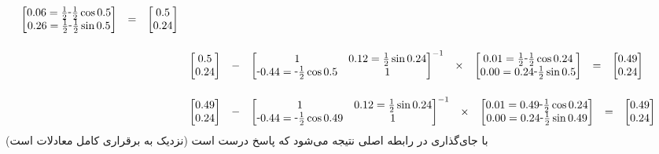 {\begin{align*}
\begin{array}{ccccccc}
\begin{bmatrix}
    0.06 = \frac{1}{2} \- \frac{1}{2} \cos{0.5} \\
    0.26 = \frac{1}{2} \- \frac{1}{2} \sin{0.5}
\end{bmatrix} &= &
\begin{bmatrix}
    0.5 \\
    0.24 
\end{bmatrix}
\end{array} \\
&\begin{array}{ccccccc}
 & & & & & \\
\begin{bmatrix}
    0.5 \\
    0.24
\end{bmatrix} & - & 
\begin{bmatrix}
    1 & 0.12 = \frac{1}{2} \sin{0.24} \\
    \-0.44 = \-\frac{1}{2} \cos{0.5} & 1
\end{bmatrix}^{-1} & \times &
\begin{bmatrix}
    0.01 = \frac{1}{2} \- \frac{1}{2} \cos{0.24} \\
    0.00 = 0.24 \- \frac{1}{2} \sin{0.5}
\end{bmatrix} &= &
\begin{bmatrix}
    0.49 \\
    0.24 
\end{bmatrix}
\end{array}
\\
&\begin{array}{ccccccc}
 & & & & & \\
\begin{bmatrix}
    0.49 \\
    0.24
\end{bmatrix} & - & 
\begin{bmatrix}
    1 & 0.12 = \frac{1}{2} \sin{0.24} \\
    \-0.44 = \-\frac{1}{2} \cos{0.49} & 1
\end{bmatrix}^{-1} & \times &
\begin{bmatrix}
    0.01 = 0.49 \- \frac{1}{2} \cos{0.24} \\
    0.00 = 0.24 \- \frac{1}{2} \sin{0.49}
\end{bmatrix} &= &
\begin{bmatrix}
    0.49 \\
    0.24 
\end{bmatrix}
\end{array}
\end{align*}
با جای‌گذاری در رابطه اصلی نتیجه می‌شود که پاسخ درست است 
(نزدیک به برقراری کامل معادلات است)
}